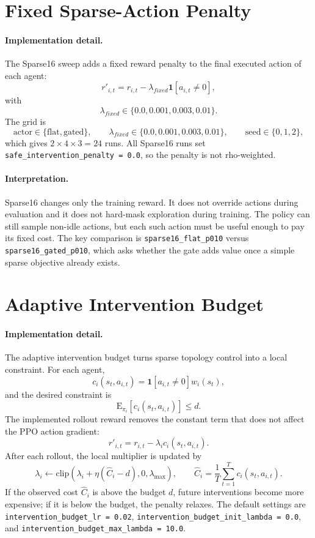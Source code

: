 \section{Fixed Sparse-Action Penalty}
\label{subsec:sparse-control-fixed-penalty}

\paragraph{Implementation detail.}
The Sparse16 sweep adds a fixed reward penalty to the final executed action of
each agent:
\[
  r'_{i,t}=r_{i,t}
  -\lambda_{fixed}\mathbf{1}[a_{i,t}\neq0],
\]
with
\[
  \lambda_{fixed}\in\{0.0,0.001,0.003,0.01\}.
\]
The grid is
\[
  \text{actor}\in\{\text{flat},\text{gated}\},\qquad
  \lambda_{fixed}\in\{0.0,0.001,0.003,0.01\},\qquad
  \text{seed}\in\{0,1,2\},
\]
which gives \(2\times4\times3=24\) runs. All Sparse16 runs set
\texttt{safe\_intervention\_penalty = 0.0}, so the penalty is not rho-weighted.

\paragraph{Interpretation.}
Sparse16 changes only the training reward. It does not override actions during
evaluation and it does not hard-mask exploration during training. The policy can
still sample non-idle actions, but each such action must be useful enough to pay
its fixed cost. The key comparison is \texttt{sparse16\_flat\_p010} versus
\texttt{sparse16\_gated\_p010}, which asks whether the gate adds value once a
simple sparse objective already exists.

\section{Adaptive Intervention Budget}
\label{subsec:sparse-control-aib}

\paragraph{Implementation detail.}
The adaptive intervention budget turns sparse topology control into a local
constraint. For each agent,
\[
  c_i(s_t,a_{i,t})=
  \mathbf{1}[a_{i,t}\neq0]w_i(s_t),
\]
and the desired constraint is
\[
  \mathrm{E}_{\pi_i}\left[c_i(s_t,a_{i,t})\right]\le d.
\]
The implemented rollout reward removes the constant term that does not affect
the PPO action gradient:
\[
  r'_{i,t}=r_{i,t}-\lambda_i c_i(s_t,a_{i,t}).
\]
After each rollout, the local multiplier is updated by
\[
  \lambda_i\leftarrow
  \mathrm{clip}\left(
    \lambda_i+\eta(\hat C_i-d),
    0,
    \lambda_{\max}
  \right),
  \qquad
  \hat C_i=\frac{1}{T}\sum_{t=1}^{T}c_i(s_t,a_{i,t}).
\]
If the observed cost \(\hat C_i\) is above the budget \(d\), future
interventions become more expensive; if it is below the budget, the penalty
relaxes. The default settings are \texttt{intervention\_budget\_lr = 0.02},
\texttt{intervention\_budget\_init\_lambda = 0.0}, and
\texttt{intervention\_budget\_max\_lambda = 10.0}.

